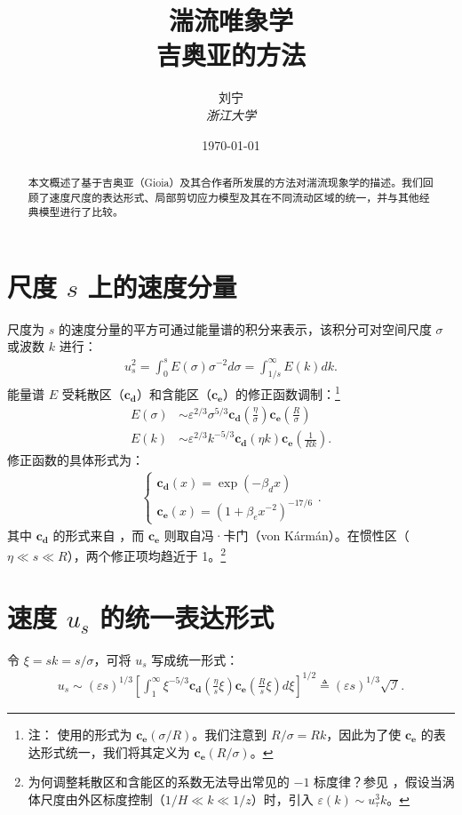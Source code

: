 \documentclass[10pt]{article}
\title{湍流唯象学 \\ \large 吉奥亚\his 的方法}
\author{刘宁 \\ \textit{浙江大学}} %
\date{\today}
\begin{document}
\maketitle
\begin{abstract}
本文概述了基于吉奥亚（Gioia）及其合作者所发展的方法对湍流现象学的描述。我们回顾了速度尺度的表达形式、局部剪切应力模型及其在不同流动区域的统一，并与其他经典模型进行了比较。
\end{abstract}

\section{尺度 $s$ 上的速度分量}
尺度为 $s$ 的速度分量的平方可通过能量谱的积分来表示，该积分可对空间尺度 $\sigma$ 或波数 $k$ 进行：
\begin{align*}
    u_s^2 = \int_0^s E(\sigma) \sigma^{-2} d\sigma = \int_{1 / s}^{\infty} E(k) dk
.\end{align*}
能量谱 $E$ 受耗散区（$\mathbf{c_d}$）和含能区（$\mathbf{c_e}$）的修正函数调制：\footnote{注：\citet{gioiaFriction2006} 使用的形式为 $\mathbf{c_e} \left( \sigma / R \right)$。我们注意到 $R / \sigma = Rk$，因此为了使 $\mathbf{c_e}$ 的表达形式统一，我们将其定义为 $\mathbf{c_e} \left( R / \sigma \right)$。}
\begin{align*}
    E(\sigma) &\sim \varepsilon^{2 / 3} \sigma^{5 / 3} \mathbf{c_d} \left( \frac{\eta}{\sigma} \right) \mathbf{c_e} \left( \frac{R}{\sigma} \right) \\
    E(k) &\sim \varepsilon^{2 / 3} k^{-5 / 3} \mathbf{c_d} (\eta k) \mathbf{c_e} \left( \frac{1}{Rk} \right).
\end{align*}
修正函数的具体形式为：
\begin{align*}
    \begin{cases}
        \mathbf{c_d}\left( x \right)  = \exp\left( -\beta_d x \right) \\
        \mathbf{c_e} \left( x \right) = \left( 1+\beta_e x^{-2} \right) ^{-17 / 6} 
    \end{cases}
.\end{align*}
其中 $\mathbf{c_d}$ 的形式来自 \citet{gioiaFriction2006}，而 $\mathbf{c_e}$ 则取自冯·卡门（von Kármán）。在惯性区（$\eta \ll s \ll R$），两个修正项均趋近于 1。\footnote{为何调整耗散区和含能区的系数无法导出常见的 $-1$ 标度律？参见 \cite{nikora1999prl}，假设当涡体尺度由外区标度控制（$1 / H \ll k \ll 1 / z$）时，引入 $\varepsilon(k) \sim u_{\tau }^3 k$。}

\section{速度 $u_s$ 的统一表达形式}
令 $\xi = sk = s / \sigma$，可将 $u_s$ 写成统一形式：
\begin{align*}
    u_s \sim \left( \varepsilon s \right) ^{1 / 3} \left[ \int_1^{\infty} \xi^{-5 / 3} \mathbf{c_d}\left( \frac{\eta}{s} \xi \right) \mathbf{c_e} \left( \frac{R}{s} \xi \right) d\xi \right]^{1 / 2}  \triangleq \left( \varepsilon s \right) ^{1 / 3} \sqrt{\mathcal{I} } 
.\end{align*}
\end{document}
